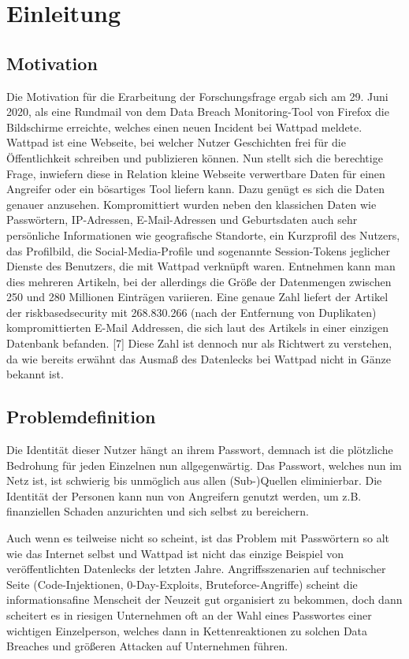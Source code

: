 \chapter{Einleitung}

\section{Motivation}
Die Motivation für die Erarbeitung der Forschungsfrage ergab sich am 29. Juni 2020, als eine Rundmail von dem Data Breach Monitoring-Tool von Firefox die Bildschirme erreichte, welches einen neuen Incident bei Wattpad meldete. Wattpad ist eine Webseite, bei welcher Nutzer Geschichten frei für die Öffentlichkeit schreiben und publizieren können. Nun stellt sich die berechtige Frage, inwiefern diese in Relation kleine Webseite verwertbare Daten für einen Angreifer oder ein bösartiges Tool liefern kann. Dazu genügt es sich die Daten genauer anzusehen. Kompromittiert wurden neben den klassichen Daten wie Passwörtern, IP-Adressen, E-Mail-Adressen und Geburtsdaten auch sehr persönliche Informationen wie geografische Standorte, ein Kurzprofil des Nutzers, das Profilbild, die Social-Media-Profile und sogenannte Session-Tokens jeglicher Dienste des Benutzers, die mit Wattpad verknüpft waren. Entnehmen kann man dies mehreren Artikeln, bei der allerdings die Größe der Datenmengen zwischen 250 und 280 Millionen Einträgen variieren. Eine genaue Zahl liefert der Artikel der riskbasedsecurity mit 268.830.266 (nach der Entfernung von Duplikaten) kompromittierten E-Mail Addressen, die sich laut des Artikels in einer einzigen Datenbank befanden. [7] Diese Zahl ist dennoch nur als Richtwert zu verstehen, da wie bereits erwähnt das Ausmaß des Datenlecks bei Wattpad nicht in Gänze bekannt ist.

\section{Problemdefinition}
Die Identität dieser Nutzer hängt an ihrem Passwort, demnach ist die plötzliche Bedrohung für jeden Einzelnen nun allgegenwärtig. Das Passwort, welches nun im Netz ist, ist schwierig bis unmöglich aus allen (Sub-)Quellen eliminierbar. Die Identität der Personen kann nun von Angreifern genutzt werden, um z.B. finanziellen Schaden anzurichten und sich selbst zu bereichern.
\newpage

Auch wenn es teilweise nicht so scheint, ist das Problem mit Passwörtern so alt wie das Internet selbst und Wattpad ist nicht das einzige Beispiel von veröffentlichten Datenlecks der letzten Jahre. Angriffsszenarien auf technischer Seite (Code-Injektionen, 0-Day-Exploits, Bruteforce-Angriffe) scheint die informationsafine Menscheit der Neuzeit gut organisiert zu bekommen, doch dann scheitert es in riesigen Unternehmen oft an der Wahl eines Passwortes einer wichtigen Einzelperson, welches dann in Kettenreaktionen zu solchen Data Breaches und größeren Attacken auf Unternehmen führen.

